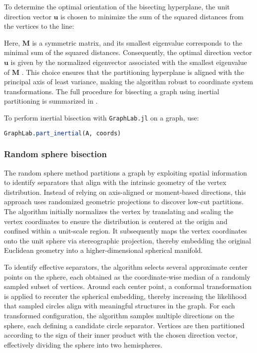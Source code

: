 \documentclass[../paper.tex]{subfiles}
\begin{document}
    
    To determine the optimal orientation of the bisecting hyperplane, the unit direction vector $\mathbf{u}$ is chosen to minimize the sum of the squared
    distances from the vertices to the line:
    
    
    
    Here, $\mathbf{M}$ is a symmetric matrix, and its smallest eigenvalue corresponds to the minimal sum of the squared distances. Consequently, the optimal direction vector $\mathbf{u}$ is given by the
    normalized eigenvector associated with the smallest eigenvalue of
    $\mathbf{M}$ \cite{elsner1997graph}. This choice ensures that the partitioning hyperplane is aligned with the principal axis of least variance, making the algorithm robust to coordinate system transformations. The full procedure for bisecting a graph using inertial partitioning is summarized in .
    
    

    To perform inertial bisection with \texttt{GraphLab.jl} on a graph, use:

    \begin{lstlisting}[language=Julia]
    GraphLab.part_inertial(A, coords)
    \end{lstlisting}

    \subsubsection{Random sphere bisection}
    \label{sub:rand_sphere}
    The random sphere method \cite{doi:10.1137/S1064827594275339} partitions a graph
    by exploiting spatial information to identify separators that align with the intrinsic geometry of the vertex
    distribution.
    Instead of relying on axis-aligned or moment-based directions,
    this approach uses randomized geometric projections to discover low-cut partitions.
    The algorithm initially normalizes the vertex by translating and scaling the vertex coordinates to ensure the distribution is centered at the origin and confined within a unit-scale region.
    It subsequently maps the vertex coordinates onto the unit sphere via stereographic projection, thereby embedding the original Euclidean geometry into a higher-dimensional spherical manifold.

    To identify effective separators, the algorithm selects
    several approximate center points on the sphere, each obtained as the coordinate-wise median of a randomly sampled subset of vertices.
    Around each center point, a conformal transformation is applied to recenter the spherical embedding, thereby increasing the likelihood that sampled circles align with meaningful structures in the graph.
    For each transformed configuration, the algorithm samples
    multiple directions on the sphere, each defining a candidate circle separator.
    Vertices are then partitioned according to the sign of their
    inner product with the chosen direction vector, effectively
    dividing the sphere into two hemispheres.
\end{document}
